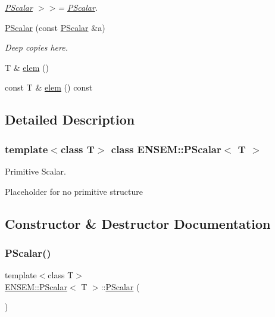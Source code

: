 \begin{DoxyCompactItemize}
\begin{DoxyCompactList}\small\item\em \mbox{\hyperlink{classENSEM_1_1PScalar}{P\+Scalar}} $>$$>$= \mbox{\hyperlink{classENSEM_1_1PScalar}{P\+Scalar}}. \end{DoxyCompactList}\item 
\mbox{\hyperlink{classENSEM_1_1PScalar_a2bf292f92c6654475bf2bc93c48adcd1}{P\+Scalar}} (const \mbox{\hyperlink{classENSEM_1_1PScalar}{P\+Scalar}} \&a)
\begin{DoxyCompactList}\small\item\em Deep copies here. \end{DoxyCompactList}\item 
T \& \mbox{\hyperlink{classENSEM_1_1PScalar_aac65f47beae4fa376f101587344c1589}{elem}} ()
\item 
const T \& \mbox{\hyperlink{classENSEM_1_1PScalar_ac20d84af6de415de7ad63292ad278542}{elem}} () const
\end{DoxyCompactItemize}


\subsection{Detailed Description}
\subsubsection*{template$<$class T$>$\newline
class E\+N\+S\+E\+M\+::\+P\+Scalar$<$ T $>$}

Primitive Scalar. 

Placeholder for no primitive structure 

\subsection{Constructor \& Destructor Documentation}
\mbox{\label{classENSEM_1_1PScalar_a0f70e3ea4cc0d0f1753a2ed87ecf2e04}} 
\subsubsection{\texorpdfstring{PScalar()}{PScalar()}\hspace{0.1cm}{\footnotesize\ttfamily [1/18]}}
{\footnotesize\ttfamily template$<$class T$>$ \\
\mbox{\hyperlink{classENSEM_1_1PScalar}{E\+N\+S\+E\+M\+::\+P\+Scalar}}$<$ T $>$\+::\mbox{\hyperlink{classENSEM_1_1PScalar}{P\+Scalar}} (\begin{DoxyParamCaption}{ }\end{DoxyParamCaption})\hspace{0.3cm}{\ttfamily [inline]}}

